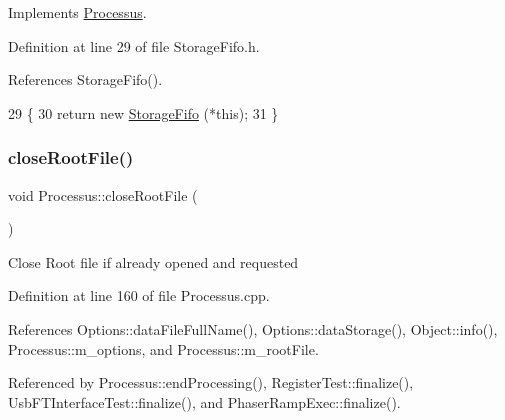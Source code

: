 Implements \hyperlink{classProcessus_aca8856f6d6d7b7e1fe941f298dcbb502}{Processus}.



Definition at line 29 of file Storage\+Fifo.\+h.



References Storage\+Fifo().


\begin{DoxyCode}
29                       \{
30     \textcolor{keywordflow}{return} \textcolor{keyword}{new} \hyperlink{classStorageFifo_a223700b2d5de3bd59ccf76df29f979d3}{StorageFifo} (*\textcolor{keyword}{this});
31   \}
\end{DoxyCode}
\mbox{\label{classProcessus_a2f3c41e99da4c738ea3d8f7b0d20a665}} 
\subsubsection{\texorpdfstring{close\+Root\+File()}{closeRootFile()}}
{\footnotesize\ttfamily void Processus\+::close\+Root\+File (\begin{DoxyParamCaption}{ }\end{DoxyParamCaption})\hspace{0.3cm}{\ttfamily [inherited]}}

Close Root file if already opened and requested 

Definition at line 160 of file Processus.\+cpp.



References Options\+::data\+File\+Full\+Name(), Options\+::data\+Storage(), Object\+::info(), Processus\+::m\+\_\+options, and Processus\+::m\+\_\+root\+File.



Referenced by Processus\+::end\+Processing(), Register\+Test\+::finalize(), Usb\+F\+T\+Interface\+Test\+::finalize(), and Phaser\+Ramp\+Exec\+::finalize().



